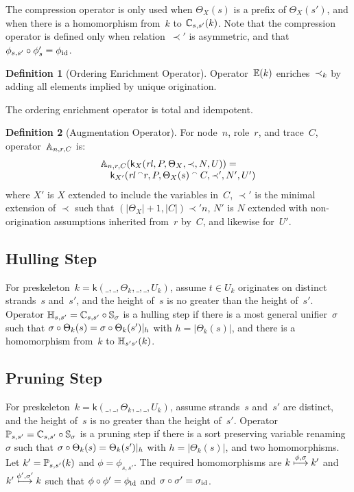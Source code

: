 \documentclass[12pt]{article}
\theoremstyle{definition}
\newtheorem{defn}{Definition}[section]
\newcommand{\skel}{\mathsf{k}}
\newcommand{\rl}{\fn{rl}}
\begin{document}
The compression operator is only used when $\Theta_X(s)$ is a prefix
of $\Theta_X(s')$, and when there is a homomorphism from~$k$ to
$\mathbb C_{s,s'}(k)$.  Note that the compression operator is defined
only when relation~$\prec'$ is asymmetric, and
that ${\mathord{\phi_{s,s'}}}\circ{\mathord{\phi'_s}}=\phi_{\mathrm{id}}$.

\begin{defn}[Ordering Enrichment Operator]
Operator~$\mathbb E(k)$ enriches~$\mathbin{\prec_{k}}$ by adding all elements implied
by unique origination.
\end{defn}
The ordering enrichment operator is total and idempotent.

\begin{defn}[Augmentation Operator]
For node~$n$, role~$r$, and trace~$C$, operator~$\mathbb A_{n,r,C}$ is:
$$\begin{array}{l}
\ops{A}_{n,r,C}(\skel_X(\rl,P,\Theta_X,\prec,N,U)) = {}\\
\quad\skel_{X'}(\rl\append r,P,
\Theta_X(s)\append C,\prec',N',U')
\end{array}$$
where $X'$ is $X$ extended to include the variables in~$C$,
$\prec'$ is the minimal extension of $\prec$ such that
$(|\Theta_X|+1,|C|)\prec' n$, $N'$ is $N$ extended with
non-origination assumptions inherited from~$r$ by~$C$, and likewise
for~$U'$.
\end{defn}

\subsection{Hulling Step}

For preskeleton~$k=\skel(\_,\_,\Theta_k,\_,\_,U_k)$, assume $t\in U_k$
originates on distinct strands~$s$ and~$s'$, and the height of~$s$ is
no greater than the height of~$s'$.  Operator
$\mathbb H_{s,s'}={\mathord{\mathbb C_{s,s'}}}\circ{\mathord{\ensuremath{\mathbb S}_\sigma}}$ is a hulling
step if there is a most general unifier~$\sigma$ such that
${\mathord{\sigma}}\circ{\mathord{\Theta_k(s)}} = {\mathord{\sigma}}\circ{\mathord{\Theta_k(s')|_{h}}}$
with $h=|\Theta_k(s)|$, and there is a homomorphism from~$k$ to
$\mathbb H_{s's'}(k)$.

\subsection{Pruning Step}

For preskeleton~$k=\skel(\_,\_,\Theta_k,\_,\_,U_k)$, assume
strands~$s$ and~$s'$ are distinct, and the height of~$s$ is
no greater than the height of~$s'$.  Operator
$\mathbb P_{s,s'}={\mathord{\mathbb C_{s,s'}}}\circ{\mathord{\ensuremath{\mathbb S}_\sigma}}$ is a pruning
step if there is a sort preserving variable renaming~$\sigma$ such
that ${\mathord{\sigma}}\circ{\mathord{\Theta_k(s)}} = \Theta_k(s')|_{h}$ with
$h=|\Theta_k(s)|$, and two homomorphisms.  Let $k'=\mathbb P_{s,s'}(k)$
and $\phi=\phi_{s,s'}$.  The required homomorphisms are
$k\stackrel{\phi,\sigma}{\longmapsto}k'$ and $k'\stackrel{\phi',\sigma'}{\longmapsto}k$
such that $\phi\circ\phi'=\phi_{\mathrm{id}}$ and $\sigma\circ\sigma'=\sigma_{\mathrm{id}}$.
\end{document}
